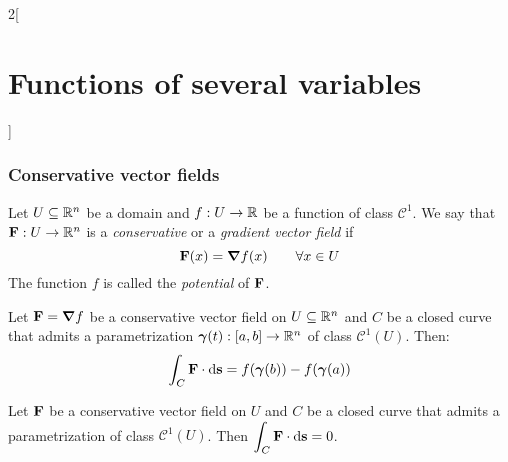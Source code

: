 \documentclass[../../../main.tex]{subfiles}
\begin{document}
\begin{multicols}{2}[\section{Functions of several variables}]
    \subsubsection*{Conservative vector fields}
    \begin{definition}
        Let $U\subseteq\mathbb{R}^n$ be a domain and $f:U\rightarrow\mathbb{R} $ be a function of class $\mathcal{C}^1$. We say that $\boldsymbol{\mathrm{F}}:U\rightarrow\mathbb{R}^n$ is a \textit{conservative} or a \textit{gradient vector field} if $$\boldsymbol{\mathrm{F}}(x)=\grad f(x)\qquad \forall x\in U$$ The function $f$ is called the \textit{potential} of $\boldsymbol{\mathrm{F}}$.
    \end{definition}
    \begin{theorem}
        Let $\boldsymbol{\mathrm{F}}=\grad f$ be a conservative vector field on $U\subseteq\mathbb{R}^n$ and $C$ be a closed curve that admits a parametrization $\boldsymbol{\mathrm{\gamma}}(t):[a,b]\rightarrow\mathbb{R}^n$ of class $\mathcal{C}^1(U)$. Then: $$\int_C\boldsymbol{\mathrm{F}}\cdot \dd \boldsymbol{\mathrm{s}}=f(\boldsymbol{\mathrm{\gamma}}(b))-f(\boldsymbol{\mathrm{\gamma}}(a))$$
    \end{theorem}
    \begin{corollary}
        Let $\boldsymbol{\mathrm{F}}$ be a conservative vector field on $U$ and $C$ be a closed curve that admits a parametrization of class $\mathcal{C}^1(U)$. Then $\displaystyle\int_C\boldsymbol{\mathrm{F}}\cdot \dd \boldsymbol{\mathrm{s}}=0$.
    \end{corollary}

\end{multicols}
\end{document}
